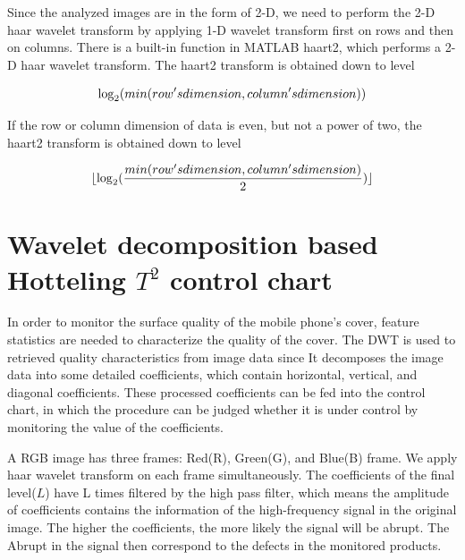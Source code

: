 Since the analyzed images are in the form of 2-D, we need to perform the 2-D haar wavelet transform by applying 1-D wavelet transform first on rows and then on columns. There is a built-in function in MATLAB haart2, which performs a 2-D haar wavelet transform.
The haart2 transform is obtained down to level


\begin{equation}
\centering \log_2(min(row's dimension,column's dimension)) \label{equa:log1}
\end{equation}

If the row or column dimension of data is even, but not a power of two, the haart2 transform is obtained down to level

\begin{equation}
\centering \lfloor \log_2(\frac{min(row's dimension,column's dimension)}{2}) \rfloor \label{equa:log2}
\end{equation}








\section{Wavelet decomposition based Hotteling $T^{2}$ control chart}
In order to monitor the surface quality of the mobile phone's cover, feature statistics are needed to characterize the quality of the cover. The DWT is used to retrieved quality characteristics from image data since It decomposes the image data into some detailed coefficients, which contain horizontal, vertical, and diagonal coefficients. These processed coefficients can be fed into the control chart, in which the procedure can be judged whether it is under control by monitoring the value of the coefficients.


A RGB image has three frames: Red(R), Green(G), and Blue(B) frame. We apply haar wavelet transform on each frame simultaneously. The coefficients of the final level($L$) have L times filtered by the high pass filter, which means the amplitude of coefficients contains the information of the high-frequency signal in the original image. The higher the coefficients, the more likely the signal will be abrupt. The Abrupt in the signal then correspond to the defects in the monitored products.


